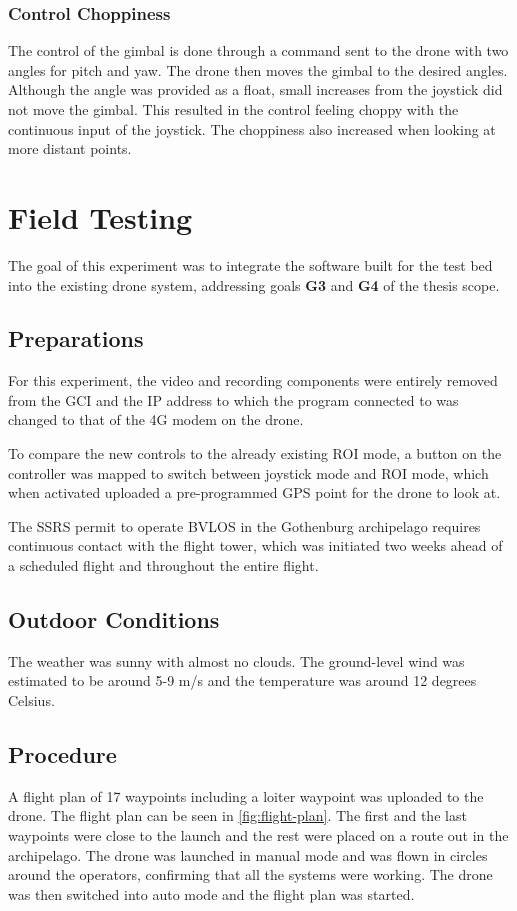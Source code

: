 \documentclass[nofilelist]{cslthse-msc}
\begin{document}
\subsubsection{Control Choppiness}
\label{sec:control-choppiness}
The control of the gimbal is done through a command sent to the drone with two angles for pitch and yaw. The drone then moves the gimbal to the desired angles. Although the angle was provided as a float, small increases from the joystick did not move the gimbal. This resulted in the control feeling choppy with the continuous input of the joystick. The choppiness also increased when looking at more distant points. 

\section{Field Testing}
The goal of this experiment was to integrate the software built for the test bed into the existing drone system, addressing goals \textbf{G3} and \textbf{G4} of the thesis scope. 

\subsection{Preparations}
For this experiment, the video and recording components were entirely removed from the GCI and the IP address to which the program connected to was changed to that of the 4G modem on the drone.

To compare the new controls to the already existing ROI mode, a button on the controller was mapped to switch between joystick mode and ROI mode, which when activated uploaded a pre-programmed GPS point for the drone to look at.

The SSRS permit to operate BVLOS in the Gothenburg archipelago requires continuous contact with the flight tower, which was initiated two weeks ahead of a scheduled flight and throughout the entire flight.

\subsection{Outdoor Conditions}
The weather was sunny with almost no clouds. The ground-level wind was estimated to be around 5-9 m/s and the temperature was around 12 degrees Celsius.

\subsection{Procedure}
A flight plan of 17 waypoints including a loiter waypoint was uploaded to the drone. The flight plan can be seen in \ref{fig:flight-plan}. The first and the last waypoints were close to the launch and the rest were placed on a route out in the archipelago. The drone was launched in manual mode and was flown in circles around the operators, confirming that all the systems were working. The drone was then switched into auto mode and the flight plan was started.
\end{document}
